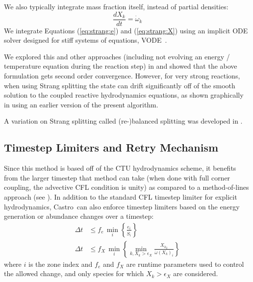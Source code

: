 \documentclass[times,modern]{aastex63}
\newcommand{\castro}{{\sf Castro}}
\newcommand{\omegadot}{\dot{\omega}}
\newcommand{\odt}[1]{{\frac{{d#1}}{dt}}}
\newcommand{\MarginPar}[1]{\marginpar{\vskip-\baselineskip\raggedright\tiny\sffamily\hrule\smallskip{\color{red}#1}\par\smallskip\hrule}}
\begin{document}
We also typically integrate mass fraction itself, instead of partial
densities:
\begin{equation}
\label{eq:strang:X}
\odt{X_k} = \omegadot_k
\end{equation}
We integrate Equations (\ref{eq:strang:e}) and (\ref{eq:strang:X}) using
an implicit ODE solver designed for stiff systems of
equations, VODE~\citep{vode}.

We explored this and other approaches (including not evolving an
energy / temperature equation during the reaction step) in
\citep{strang_rnaas} and showed that the above formulation gets second
order convergence.  However, for very strong reactions, when using
Strang splitting the state can drift significantly off of the smooth
solution to the coupled reactive hydrodynamics equations, as shown
graphically in \cite{astronum:2018} using an earlier version of the
present algorithm.

A variation on Strang splitting called (re-)balanced splitting was
developed in \citet{speth:2013}.


\subsection{Timestep Limiters and Retry Mechanism}

Since this method is based off of the CTU hydrodynamics scheme, it
benefits from the larger timestep that method can take (when done with
full corner coupling, the advective CFL condition is unity)
as compared to a method-of-lines approach (see
\citealt{ppmunsplit}).  In addition to the standard CFL timestep
limiter for explicit hydrodynamics, \castro\ can also enforce
timestep limiters based on the energy generation or abundance changes
over a timestep: \MarginPar{do we enforce this in the NSE region?}
\begin{align}
\label{eq:dt:nuce}
\Delta t &\le f_e\, \min_{i} \left\{\frac{e_{i}}{\dot{S}_{i}}\right\} \\
%
\label{eq:dt:nucX}
\Delta t &\le f_X\, \min_{i} \left\{\min_{k,X_k > \epsilon_X}\frac{{X_k}_{i}}{{\omegadot(X_k)_i}}\right\}
\end{align}
where $i$ is the zone index and $f_e$ and $f_X$ are runtime parameters
used to control the allowed change, and only species for which $X_k > \epsilon_X$ are considered.
\end{document}
